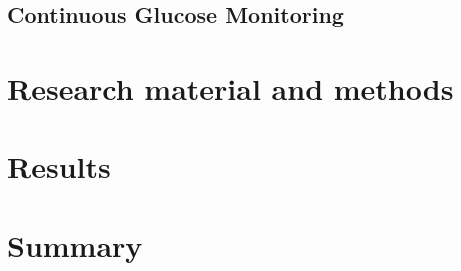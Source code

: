 \documentclass[english, 12pt, a4paper, elec, utf8, a-1b, online]{aaltothesis}
\begin{document}
\subsection{Continuous Glucose Monitoring}

\clearpage


\section{Research material and methods}

\clearpage


\section{Results}

\clearpage


\section{Summary} 

\clearpage





\clearpage

\thesisappendix
\end{document}
